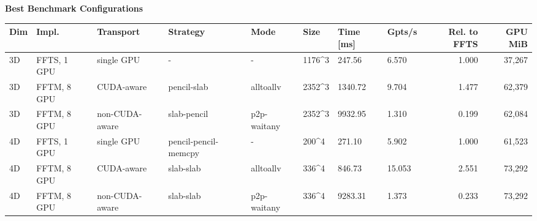 \documentclass{article}
\begin{document}
\begin{center}
{\fontsize{8.0pt}{9.4pt}\selectfont
\textbf{Best Benchmark Configurations}

\vspace{0.6em}
\begin{tabular}{llllllllrr}
\hline
Dim & Impl. & Transport & Strategy & Mode & Size & Time [ms] & Gpts/s & Rel. to FFTS & GPU MiB \\
\hline
3D & FFTS, 1 GPU & single GPU & - & - & 1176\textasciicircum{}3 & 247.56 & 6.570 & 1.000 & 37,267 \\
3D & FFTM, 8 GPU & CUDA-aware & pencil-slab & alltoallv & 2352\textasciicircum{}3 & 1340.72 & 9.704 & 1.477 & 62,379 \\
3D & FFTM, 8 GPU & non-CUDA-aware & slab-pencil & p2p-waitany & 2352\textasciicircum{}3 & 9932.95 & 1.310 & 0.199 & 62,084 \\
4D & FFTS, 1 GPU & single GPU & pencil-pencil-memcpy & - & 200\textasciicircum{}4 & 271.10 & 5.902 & 1.000 & 61,523 \\
4D & FFTM, 8 GPU & CUDA-aware & slab-slab & alltoallv & 336\textasciicircum{}4 & 846.73 & 15.053 & 2.551 & 73,292 \\
4D & FFTM, 8 GPU & non-CUDA-aware & slab-slab & p2p-waitany & 336\textasciicircum{}4 & 9283.31 & 1.373 & 0.233 & 73,292 \\
\hline
\end{tabular}
}
\end{center}
\end{document}
